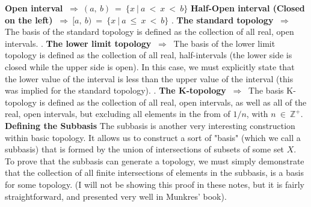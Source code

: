 \documentclass{article}
\begin{document}
\textbf{Open interval} $ \ \Rightarrow \ (a, \ b) \ = \ \{x \ | \ a \ < \ x \ < \ b\}$
\newline\newline
\textbf{Half-Open interval (Closed on the left)} $ \ \Rightarrow \ [a, \ b) \ = \ \{x \ | \ a \ \leq \ x \ < \ b\}$
\newline{}. \textbf{The standard topology} $ \ \Rightarrow \ $ The basis of the standard topology is defined as the collection of all real, open intervals.
\newline{}. \textbf{The lower limit topology} $ \ \Rightarrow \ $ The basis of the lower limit topology is defined as the collection of all real, half-intervals (the lower side is closed while the upper side is open). In this case, we must explicitly state that the lower value of the interval is less than the upper value of the interval (this was implied for the standard topology).
\newline{}. \textbf{The K-topology} $ \ \Rightarrow \ $ The basis K-topology is defined as the collection of all real, open intervals, as well as all of the real, open intervals, but excluding all elements in the from of $1/n$, with $n \ \in \ \mathbb{Z^{+}}$. 
\newline\newline
\textbf{Defining the Subbasis}
\newline\newline
The subbasis is another very interesting construction within basic topology. It allows us to construct a sort of "basis" (which we call a subbasis) that is formed by the union of intersections of subsets of some set $X$. To prove that the subbasis can generate a topology, we must simply demonstrate that the collection of all finite intersections of elements in the subbasis, is a basis for some topology. (I will not be showing this proof in these notes, but it is fairly straightforward, and presented very well in Munkres' book).
\newline\newline
\end{document}
